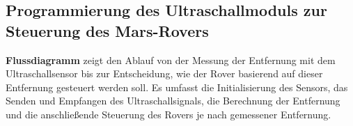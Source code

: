 \documentclass{vorlage-design-main}
\begin{document}
\newpage

\hypertarget{programmierung-des-ultraschallmoduls-zur-steuerung-des-mars-rovers}{%
\subsection{Programmierung des Ultraschallmoduls zur Steuerung des
Mars-Rovers}\label{programmierung-des-ultraschallmoduls-zur-steuerung-des-mars-rovers}}

\textbf{Flussdiagramm} zeigt den Ablauf von der Messung der Entfernung
mit dem Ultraschallsensor bis zur Entscheidung, wie der Rover basierend
auf dieser Entfernung gesteuert werden soll. Es umfasst die
Initialisierung des Sensors, das Senden und Empfangen des
Ultraschallsignals, die Berechnung der Entfernung und die anschließende
Steuerung des Rovers je nach gemessener Entfernung.
\end{document}
